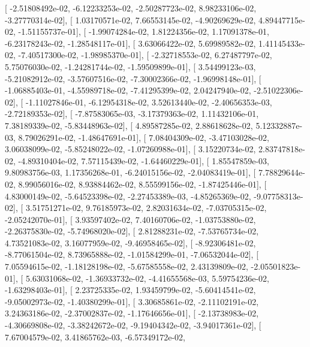 \documentclass{article}
\begin{document}
       [ -2.51808492e-02,  -6.12233253e-02,  -2.50287723e-02,
          8.98233106e-02,  -3.27770314e-02],
       [  1.03170571e-02,   7.66553145e-02,  -4.90269629e-02,
          4.89447715e-02,  -1.51155737e-01],
       [ -1.99074284e-02,   1.81224356e-02,   1.17091378e-01,
         -6.23178243e-02,  -1.28548117e-01],
       [  3.63066422e-02,   5.69989582e-02,   1.41145433e-02,
         -7.40517300e-02,  -1.98985370e-01],
       [ -2.32718553e-02,   6.27487797e-02,   5.75076030e-02,
         -1.24281744e-02,  -1.59509899e-01],
       [  3.54499123e-03,  -5.21082912e-02,  -3.57607516e-02,
         -7.30002366e-02,  -1.96998148e-01],
       [ -1.06885403e-01,  -4.55989718e-02,  -7.41295399e-02,
          2.04247940e-02,  -2.51022306e-02],
       [ -1.11027846e-01,  -6.12954318e-02,   3.52613440e-02,
         -2.40656353e-03,  -2.72189353e-02],
       [ -7.87583065e-03,  -3.17379363e-02,   1.11432106e-01,
          7.38189339e-02,  -5.83448963e-02],
       [  4.89587285e-02,   2.88618628e-02,   5.12332887e-03,
          8.79026291e-02,  -1.48647691e-01],
       [  7.08404309e-02,  -3.47103028e-02,   3.06038099e-02,
         -5.85248022e-02,  -1.07260988e-01],
       [  3.15220734e-02,   2.83747818e-02,  -4.89310404e-02,
          7.57115439e-02,  -1.64460229e-01],
       [  1.85547859e-03,   9.80983756e-03,   1.17356268e-01,
         -6.24015156e-02,  -2.04083419e-01],
       [  7.78829644e-02,   8.99056016e-02,   8.93884462e-02,
          8.55599156e-02,  -1.87425446e-01],
       [  4.83000149e-02,  -5.64523398e-02,  -2.27453389e-03,
         -4.85265369e-02,  -9.07758313e-02],
       [  3.51751271e-02,   9.76185973e-02,   2.82031634e-02,
         -7.03705315e-02,  -2.05242070e-01],
       [  3.93597402e-02,   7.40160706e-02,  -1.03753880e-02,
         -2.26375830e-02,  -5.74968020e-02],
       [  2.81288231e-02,  -7.53765734e-02,   4.73521083e-02,
          3.16077959e-02,  -9.46958465e-02],
       [ -8.92306481e-02,  -8.77061504e-02,   8.73965888e-02,
         -1.01584299e-01,  -7.06532044e-02],
       [  7.05594615e-02,  -1.18128198e-02,  -5.67585558e-02,
          2.43139809e-02,  -2.05501823e-01],
       [  5.63031068e-02,  -1.36933732e-02,  -4.41655568e-03,
          5.59754236e-02,  -1.63298403e-01],
       [  2.23725335e-02,   1.93459799e-02,  -5.60414541e-02,
         -9.05002973e-02,  -1.40380299e-01],
       [  3.30685861e-02,  -2.11102191e-02,   3.24363186e-02,
         -2.37002837e-02,  -1.17646656e-01],
       [ -2.13738983e-02,  -4.30669808e-02,  -3.38242672e-02,
         -9.19404342e-02,  -3.94017361e-02],
       [  7.67004579e-02,   3.41865762e-03,  -6.57349172e-02,
\end{document}
